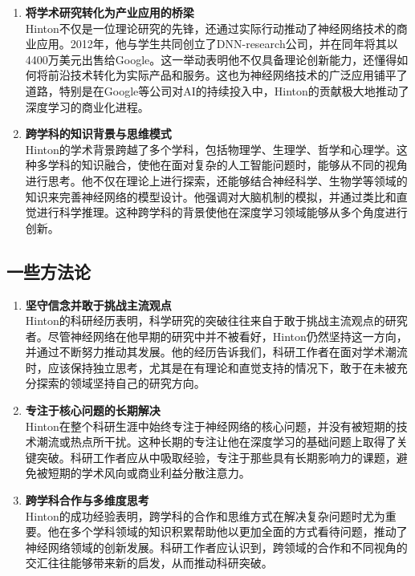 \documentclass[UTF8]{homework}
\begin{document}
\begin{homeworkProblem}
\begin{enumerate}
	\item \textbf{将学术研究转化为产业应用的桥梁} \\
	Hinton不仅是一位理论研究的先锋，还通过实际行动推动了神经网络技术的商业应用。2012年，他与学生共同创立了DNN-research公司，并在同年将其以4400万美元出售给Google。这一举动表明他不仅具备理论创新能力，还懂得如何将前沿技术转化为实际产品和服务。这也为神经网络技术的广泛应用铺平了道路，特别是在Google等公司对AI的持续投入中，Hinton的贡献极大地推动了深度学习的商业化进程。
	
	\item \textbf{跨学科的知识背景与思维模式} \\
	Hinton的学术背景跨越了多个学科，包括物理学、生理学、哲学和心理学。这种多学科的知识融合，使他在面对复杂的人工智能问题时，能够从不同的视角进行思考。他不仅在理论上进行探索，还能够结合神经科学、生物学等领域的知识来完善神经网络的模型设计。他强调对大脑机制的模拟，并通过类比和直觉进行科学推理。这种跨学科的背景使他在深度学习领域能够从多个角度进行创新。
	
\end{enumerate}

\subsection{一些方法论}

\begin{enumerate}
	\item \textbf{坚守信念并敢于挑战主流观点} \\
	Hinton的科研经历表明，科学研究的突破往往来自于敢于挑战主流观点的研究者。尽管神经网络在他早期的研究中并不被看好，Hinton仍然坚持这一方向，并通过不断努力推动其发展。他的经历告诉我们，科研工作者在面对学术潮流时，应该保持独立思考，尤其是在有理论和直觉支持的情况下，敢于在未被充分探索的领域坚持自己的研究方向。
	
	\item \textbf{专注于核心问题的长期解决} \\
	Hinton在整个科研生涯中始终专注于神经网络的核心问题，并没有被短期的技术潮流或热点所干扰。这种长期的专注让他在深度学习的基础问题上取得了关键突破。科研工作者应从中吸取经验，专注于那些具有长期影响力的课题，避免被短期的学术风向或商业利益分散注意力。
	
	\item \textbf{跨学科合作与多维度思考} \\
	Hinton的成功经验表明，跨学科的合作和思维方式在解决复杂问题时尤为重要。他在多个学科领域的知识积累帮助他以更加全面的方式看待问题，推动了神经网络领域的创新发展。科研工作者应认识到，跨领域的合作和不同视角的交汇往往能够带来新的启发，从而推动科研突破。
	

\end{enumerate}
\end{homeworkProblem}
\end{document}
